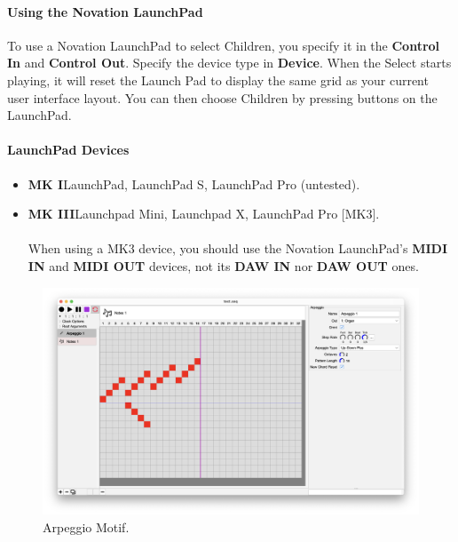 \documentclass[twoside,10pt]{article}
\begin{document}
\paragraph{Using the Novation LaunchPad}

To use a Novation LaunchPad to select Children, you specify it in the {\bf Control In} and {\bf Control Out}.  Specify the device type in {\bf Device}.  When the Select starts playing, it will reset the Launch Pad to display the same grid as your current user interface layout.  You can then choose Children by pressing buttons on the LaunchPad.

\paragraph{LaunchPad Devices}

\begin{itemize}
\item {\bf MK I}\qquad LaunchPad, LaunchPad S, LaunchPad Pro (untested).   
\item {\bf MK III}\qquad Launchpad Mini, Launchpad X, LaunchPad Pro [MK3].\\\\When using a MK3 device, you should use the Novation LaunchPad's {\bf MIDI IN} and {\bf MIDI OUT} devices, not its {\bf DAW IN} nor {\bf DAW OUT} ones.  

\end{itemize}

\clearpage

\begin{figure}[t]
\centering
\includegraphics[width=6.5in]{Arpeggio}
\vspace{-2em}
\caption{Arpeggio Motif.}
\label{arpeggio}
\end{figure}
\end{document}
